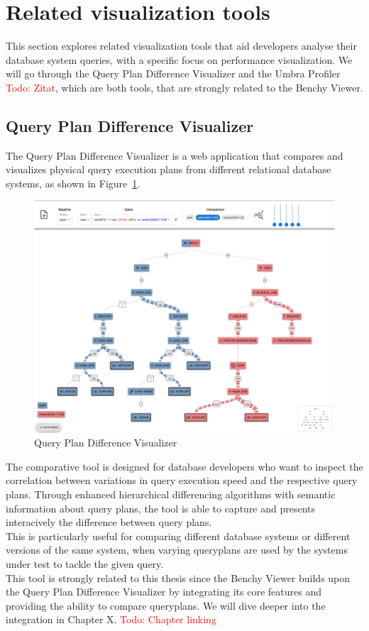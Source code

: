 \section{Related visualization tools}

This section explores related visualization tools that aid developers analyse their database system queries, with a specific focus on performance visualization. We will go through the Query Plan Difference Visualizer and the Umbra Profiler \textcolor{red}{Todo: Zitat}, which are both tools, that are strongly related to the Benchy Viewer. 


\subsection{Query Plan Difference Visualizer}
\label{subsec:semantic-diff}

The Query Plan Difference Visualizer is a web application that compares and visualizes physical query execution plans from different relational database systems, as shown in Figure~\ref{fig:semantic-diff}.
\begin{figure}[h]
    \centering
    \includegraphics[width=0.8\linewidth]{figures/semantic-diff.png}
    \caption{Query Plan Difference Visualizer}
    \label{fig:semantic-diff}
  \end{figure}

\noindent The comparative tool is designed for database developers who want to inspect the correlation between variations in query execution speed and the respective query plans. Through enhanced hierarchical differencing algorithms with semantic information about query plans, the tool is able to capture and presents interacively the difference between query plans.
\\This is particularly useful for comparing different database systems or different versions of the same system, when varying queryplans are used by the systems under test to tackle the given query.
\\This tool is strongly related to this thesis since the Benchy Viewer builds upon the Query Plan Difference Visualizer by integrating its core features and providing the ability to compare queryplans. We will dive deeper into the integration in Chapter X. \textcolor{red}{Todo: Chapter linking}



